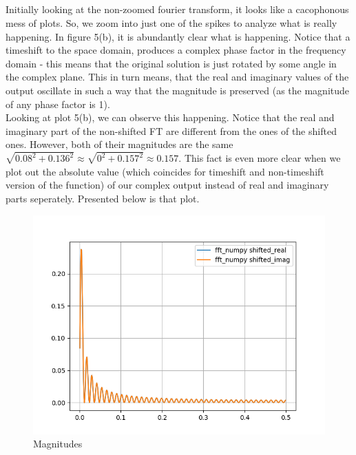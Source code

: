 \documentclass[12pt]{article}
\begin{document}
\\\\\\\\ Initially looking at the non-zoomed fourier transform, it looks like a cacophonous mess of plots. So, we zoom into just one of the spikes to analyze what is really happening.  In figure 5(b), it is abundantly clear what is happening. Notice that a timeshift to the space domain, produces a complex phase factor in the frequency domain - this means that the original solution is just rotated by some angle in the complex plane. This in turn means, that the real and imaginary values of the output oscillate in such a way that the magnitude is preserved (as the magnitude of any phase factor is 1). \\ Looking at plot 5(b), we can observe this happening. Notice that the real and imaginary part of the non-shifted FT are different from the ones of the shifted ones. However, both of their magnitudes are the same $\sqrt{0.08^2 + 0.136^2} \approx \sqrt{0^2 + 0.157^2} \approx 0.157$. This fact is even more clear when we plot out the absolute value (which coincides for timeshift and non-timeshift version of the function) of our complex output instead of real and imaginary parts seperately. Presented below is that plot. 

\begin{figure}[h]
	\centering
	\includegraphics[scale=0.40]{magnitudes.png}
	\caption{Magnitudes}
\end{figure}
\end{document}
